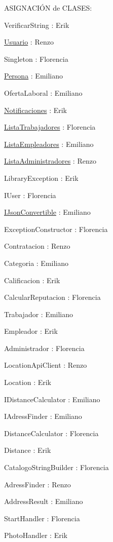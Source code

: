 ASIGNACIÓN de CLASES\+:
\begin{DoxyItemize}
\item Verificar\+String \+: Erik
\item \mbox{\hyperlink{class_usuario}{Usuario}} \+: Renzo
\item Singleton \+: Florencia
\item \mbox{\hyperlink{class_persona}{Persona}} \+: Emiliano
\item Oferta\+Laboral \+: Emiliano
\item \mbox{\hyperlink{class_notificaciones}{Notificaciones}} \+: Erik
\item \mbox{\hyperlink{class_lista_trabajadores}{Lista\+Trabajadores}} \+: Florencia
\item \mbox{\hyperlink{class_lista_empleadores}{Lista\+Empleadores}} \+: Emiliano
\item \mbox{\hyperlink{class_lista_administradores}{Lista\+Administradores}} \+: Renzo
\item Library\+Exception \+: Erik
\item IUser \+: Florencia
\item \mbox{\hyperlink{interface_i_json_convertible}{IJson\+Convertible}} \+: Emiliano
\item Exception\+Constructor \+: Florencia
\item Contratacion \+: Renzo
\item Categoria \+: Emiliano
\item Calificacion \+: Erik
\item Calcular\+Reputacion \+: Florencia
\item Trabajador \+: Emiliano
\item Empleador \+: Erik
\item Administrador \+: Florencia
\item Location\+Api\+Client \+: Renzo
\item Location \+: Erik
\item IDistance\+Calculator \+: Emiliano
\item IAdress\+Finder \+: Emiliano
\item Distance\+Calculator \+: Florencia
\item Distance \+: Erik
\item Catalogo\+String\+Builder \+: Florencia
\item Adress\+Finder \+: Renzo
\item Address\+Result \+: Emiliano
\item Start\+Handler \+: Florencia
\item Photo\+Handler \+: Erik

\end{DoxyItemize}
